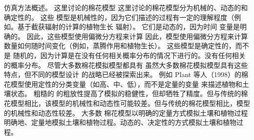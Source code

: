 仿真方法概述。
这里讨论的棉花模型 这里讨论的棉花模型分为机械的、动态的和确定性的。
这些 模型是机械性的，因为它们描述的过程有一定的理解程度（例如。基于截获辐射的计算的植物生长 辐射）。
它们是动态的，因为时间 变量是明确的。
因此，这些模型使用偏微分方程来计算 因此，模型使用偏微分方程来计算数量如何随时间变化（例如，蒸腾作用和植物生长）。
这些模型是确定性的，而不是 随机的，因为计算是在没有任何相关概率分布的情况下进行的。没有任何相关的概率分布。
尽管大多数棉花模拟模型都具有 虽然大多数棉花模拟模型具有这些特点，但不同的模型设计 的战略已经被探索出来。
例如 Plant 等人（1998）的棉花模型使用定性的分类变量（如高、中、低），而不是定量的变量 来描述植物和土壤状态。
粗糙的 的粗放性提高了模拟的稳健性，但却牺牲了精度。但与传统的棉花模型相比，该模型的机械性和动态性可能较差。但与传统的棉花模型相比，模型的机械性和动态性较差。
大多数 棉花模型以明确的定量方式模拟土壤和植物过程 明确地、定量地模拟土壤和植物过程。动态的、决定性的方式模拟土壤和植物过程。

